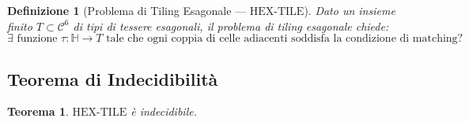 \documentclass[12pt, a4paper]{article}
\newtheorem{definizione}{Definizione}
\newtheorem{teorema}{Teorema}
\begin{document}
\begin{definizione}[Problema di Tiling Esagonale — $\mathrm{HEX\text{-}TILE}$]
Dato un insieme finito $T \subset \mathcal{C}^6$ di tipi di tessere esagonali,
il \emph{problema di tiling esagonale} chiede:
\[
  \exists \text{ funzione } \tau : \mathbb{H} \to T
  \text{ tale che ogni coppia di celle adiacenti soddisfa la condizione di matching?}
\]
\end{definizione}

\subsection{Teorema di Indecidibilità}

\begin{teorema}
\label{thm:undec}
$\mathrm{HEX\text{-}TILE}$ è indecidibile.
\end{teorema}
\end{document}
